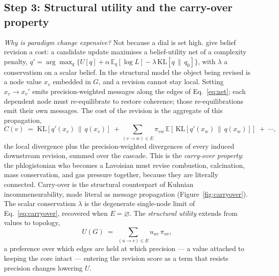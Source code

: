\subsection{Step 3: Structural utility and the carry-over property}
\label{ssec:carryover}

\noindent\textit{Why is paradigm change expensive?} Not because a dial
is set high. \citet{hylandAlbarracin2025MindChange} give belief revision
a cost: a candidate update maximises a belief-utility net of a
complexity penalty, $q' = \arg\max_q \{ U[q] + \alpha\,\mathbb{E}_q[\log
L] - \lambda\,\mathrm{KL}[q \,\|\, q_0]\}$, with $\lambda$ a conservatism
on a scalar belief. In the structural model the object being revised is a
node value $x_v$ embedded in $G$, and a revision cannot stay local.
Setting $x_v \to x_v'$ emits precision-weighted messages along the edges
of Eq.~\eqref{eq:net}; each dependent node must re-equilibrate to restore
coherence; those re-equilibrations emit their own messages. The cost of
the revision is the aggregate of this propagation,
\begin{equation}
C(v) \;=\; \mathrm{KL}\!\left[q'(x_v) \,\|\, q(x_v)\right]
\;+\!\!\sum_{(v \to w) \in E}\!\! \pi_{vw}\,
   \mathbb{E}\!\left[\,\mathrm{KL}\!\left[q'(x_w) \,\|\, q(x_w)\right]\right]
\;+\;\cdots,
\label{eq:carryover}
\end{equation}
the local divergence plus the precision-weighted divergences of every
induced downstream revision, summed over the cascade. This is the
\emph{carry-over property}: the phlogistonian who becomes a Lavoisian
must revise combustion, calcination, mass conservation, and gas pressure
together, because they are literally connected. Carry-over is the
structural counterpart of Kuhnian incommensurability, made literal as
message propagation (Figure~\ref{fig:carryover}). The scalar conservatism
$\lambda$ is the degenerate single-node limit of
Eq.~\eqref{eq:carryover}, recovered when $E = \varnothing$. The
\emph{structural utility} extends \citet{hylandAlbarracin2025MindChange}
from values to topology,
\begin{equation}
U(G) \;=\; \sum_{(u \to v) \in E} u_{uv}\,\pi_{uv},
\label{eq:structutil}
\end{equation}
a preference over which edges are held at which precision --- a value
attached to keeping the core intact --- entering the revision score as a
term that resists precision changes lowering $U$.

